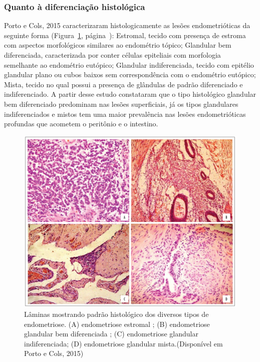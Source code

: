 \documentclass[12pt]{article} %
\begin{document}
\subsubsection{Quanto à diferenciação histológica}

Porto e Cols, 2015 caracterizaram histologicamente as lesões endometrióticas da seguinte
forma (Figura~\ref{histologico}, página~\pageref{histologico}):
Estromal, tecido com presença de estroma com aspectos morfológicos
similares ao endométrio tópico; Glandular bem diferenciada,
caracterizada por conter células epiteliais com morfologia semelhante
ao endométrio eutópico; Glandular indiferenciada, tecido com epitélio
glandular plano ou cubos baixos sem correspondência com o endométrio
eutópico; Mista, tecido no qual possui a presença de glândulas de
padrão diferenciado e indiferenciado. A partir desse estudo
constataram que o tipo histológico glandular bem diferenciado
predominam nas lesões superficiais, já os tipos glandulares
indiferenciados e mistos tem uma maior prevalência nas lesões
endometrióticas profundas que acometem o peritônio e o intestino.

\begin{figure}[h!]
\centering
\includegraphics[width=16cm]{citoendometriose1636.jpg}
\caption[Amostras histológicas de diversos tipos de endometriose]{Lâminas mostrando padrão histológico dos diversos tipos de endometriose. (A) endometriose estromal ; (B) endometriose glandular bem diferenciada ; (C) endometriose glandular indiferenciada; (D) endometriose glandular mista.(Disponível em Porto e Cols, 2015)}
\label{histologico}
\end{figure} 
\end{document}
